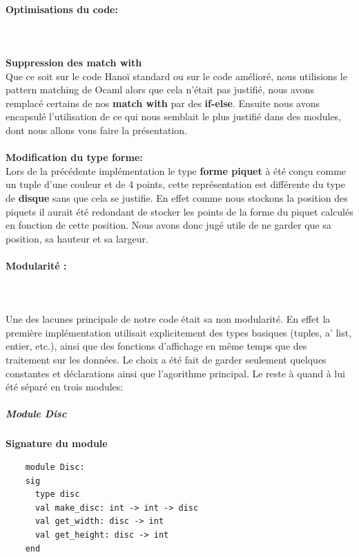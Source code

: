 \documentclass[a4paper,11pt]{article}
\begin{document}
\paragraph{Optimisations du code:} \mbox{}\\\\
\textbf{Suppression des match with}\\
Que ce soit sur le code Hanoï standard ou sur le code amélioré, nous utilisions le pattern matching de Ocaml alors que cela n'était pas justifié, nous avons remplacé certains de nos  \textbf{match with} par des \textbf{if-else}.
Ensuite nous avons encapsulé l'utilisation de ce qui nous semblait le plus justifié dans des modules, dont nous allons vous faire la présentation.\\\\
\textbf{Modification du type forme:}\\
Lors de la précédente implémentation le type \textbf{forme piquet} à été conçu comme un tuple d'une couleur et de 4 points, cette représentation est différente du type de \textbf{disque} sans que cela se justifie.
En effet comme nous stockons la position des piquets il aurait été redondant de stocker les points de la forme du piquet calculés en fonction de cette position.
Nous avons donc jugé utile de ne garder que sa position, sa hauteur et sa largeur.

\paragraph{Modularité :}\mbox{}\\\\
Une des lacunes principale de notre code était sa non modularité. En effet la première implémentation utilisait explicitement des types basiques (tuples, a' list, entier, etc.), ainsi que des fonctions d'affichage en même temps que des traitement sur les données.
Le choix a été fait de garder seulement quelques constantes et déclarations ainsi que l'agorithme principal.
Le reste à quand à lui été séparé en trois modules:

\subparagraph{Module Disc}
\begin{center}
	\textbf{Signature du module}
	\begin{lstlisting}
	module Disc:
	sig
	  type disc
	  val make_disc: int -> int -> disc
	  val get_width: disc -> int
	  val get_height: disc -> int
	end
	\end{lstlisting}
\end{center}
\end{document}
